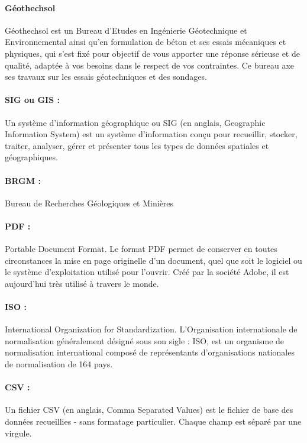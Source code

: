 \paragraph{Géothechsol}
Géothechsol est un Bureau d’Etudes 
en Ingénierie Géotechni\-que et Environnemental
ainsi qu’en formulation de béton et ses essais mécani\-ques et physiques, qui s’est
fixé pour objectif de vous apporter une réponse sérieuse et de qualité, adaptée à 
vos besoins dans le respect de vos contraintes. Ce bureau axe ses travaux sur les
essais géotechniques et des sondages.

\paragraph{SIG ou GIS :}  
Un système d'information géographique ou SIG (en anglais, Geographic 
Information System) est un système d'information conçu pour 
recueillir, stocker, traiter, analyser, gérer et présenter tous les 
types de données spatiales et géographiques. 



\paragraph{BRGM :}
Bureau de Recherches Géologiques et Minières


\paragraph{PDF :}
Portable Document Format. Le format PDF permet de conserver en 
toutes circonstances la mise en page 
originelle d'un document, quel que soit le logiciel ou le système 
d'exploitation utilisé pour l'ouvrir. Créé par la société Adobe, 
il est aujourd'hui très utilisé à travers le monde.

\paragraph{ISO :}
International Organization for Standardization.
L'Organisation internationale de normalisation généralement désigné sous son
 sigle : ISO, est un organisme de normalisation international composé de 
 représentants d'organisations nationales de normalisation de 164 pays.


\paragraph{CSV :}
Un fichier CSV (en anglais, Comma Separated Values) est le fichier de 
base des données recueillies - sans formatage particulier. Chaque 
champ est séparé par une virgule.

